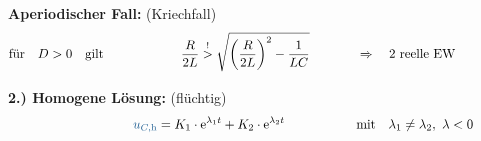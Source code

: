 \begin{frame}[t]
{\textbf{Aperiodischer Fall:} (Kriechfall)%
}%
\ifvmode\vspace*{-\baselineskip}\setlength{\parskip}{4pt}\fi%
\begin{align*}%
    &\text{für}\quad D > 0 \quad\text{gilt}&
        &\phantom{\mathrel{\phantom{=}}-}\frac{R}{2L} \overset{!}{>} \sqrt{\left(\frac{R}{2L}\right)^2 - \frac{1}{LC}}
            &&\Rightarrow\quad \text{2 reelle EW}
    \\[-10pt] &\hphantom{1rrrrrrrrrrrrrrrr} &   \hphantom{2llllll}&\hphantom{\mathrel{\phantom{=}}2rrrrrrrrrrrrrrrrrrrrrrrrrrr}     &&\hphantom{3rrrrrrrrrrrrrrrrrrrrrrrr} \nonumber
\end{align*}%
\pause%
\textbf{2.) Homogene Lösung:} (flüchtig)
\begin{align}%
    &&
        \ecv{u_{C,\mathrm{h}}} &= K_1 \cdot \mathrm{e}^{\lambda_1 t} + K_2 \cdot \mathrm{e}^{\lambda_2 t}
            &&\text{mit}\quad \lambda_1 \neq \lambda_2,\ \lambda <  0  \label{eq:dgl:rlc:homolsg:aperiodisch}
    \\[-15pt] &\hphantom{1rrrrrrrrrrrrrrrr} &   \hphantom{2llllll}&\hphantom{\mathrel{\phantom{=}}2rrrrrrrrrrrrrrrrrrrrrrrrrrr}     &&\hphantom{3rrrrrrrrrrrrrrrrrrrrrrrr} \nonumber
\end{align}%
\end{frame}
